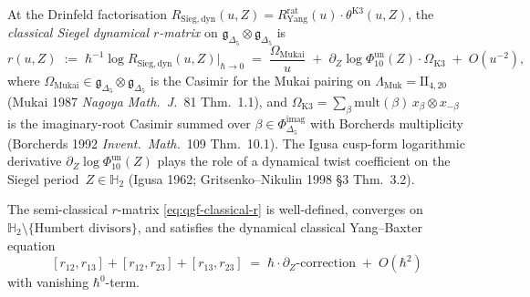 \begin{definition}
\label{def:qgf-classical-r}
At the Drinfeld factorisation
$R_{\mathrm{Sieg,dyn}}(u, Z) = R^{\mathrm{rat}}_{\mathrm{Yang}}(u)
\cdot\theta^{\mathrm{K3}}(u, Z)$, the \emph{classical Siegel dynamical
$r$-matrix} on $\mathfrak g_{\Delta_5}\otimes\mathfrak g_{\Delta_5}$
is
\begin{equation}
\label{eq:qgf-classical-r}
 r(u, Z)
 \;:=\;
 \hbar^{-1}\log R_{\mathrm{Sieg,dyn}}(u, Z)\Big|_{\hbar\to 0}
 \;=\;
 \frac{\Omega_{\mathrm{Mukai}}}{u}
 \;+\;
 \partial_Z\log\Phi_{10}^{\mathrm{un}}(Z)\cdot\Omega_{\mathrm{K3}}
 \;+\;
 O(u^{-2}),
\end{equation}
where $\Omega_{\mathrm{Mukai}}\in\mathfrak g_{\Delta_5}\otimes
\mathfrak g_{\Delta_5}$ is the Casimir for the Mukai pairing on
$\Lambda_{\mathrm{Muk}} = \mathrm{II}_{4,20}$ (Mukai 1987
\emph{Nagoya Math.\ J.}~81 Thm.~1.1), and $\Omega_{\mathrm{K3}}
= \sum_\beta\mathrm{mult}(\beta)\,x_\beta\otimes x_{-\beta}$ is the
imaginary-root Casimir summed over $\beta\in\Phi^{\mathrm{imag}}_{\Delta_5}$
with Borcherds multiplicity (Borcherds 1992
\emph{Invent.\ Math.}~109 Thm.~10.1). The Igusa cusp-form logarithmic
derivative $\partial_Z\log\Phi_{10}^{\mathrm{un}}(Z)$ plays the role of a dynamical
twist coefficient on the Siegel period~$Z\in\mathbb H_2$
(Igusa 1962; Gritsenko--Nikulin 1998 \S3 Thm.~3.2).
\end{definition}

\begin{theorem}
\label{thm:qgf-c1c2-cybe}
The semi-classical $r$-matrix
\eqref{eq:qgf-classical-r} is well-defined, converges on
$\mathbb H_2\setminus\{\text{Humbert divisors}\}$, and satisfies
the dynamical classical Yang--Baxter equation
\[
 [r_{12}, r_{13}] + [r_{12}, r_{23}] + [r_{13}, r_{23}]
 \;=\;
 \hbar\cdot\partial_Z\text{-correction}
 \;+\;
 O(\hbar^2)
\]
with vanishing $\hbar^0$-term.
\end{theorem}

